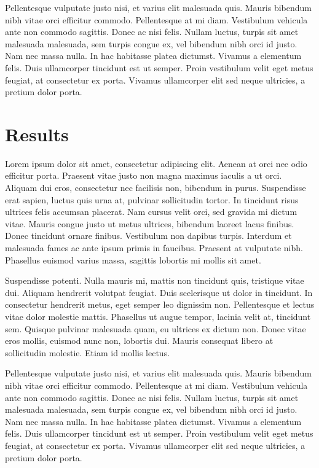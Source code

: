 \documentclass[12pt,]{article}
\begin{document}
Pellentesque vulputate justo nisi, et varius elit malesuada quis. Mauris
bibendum nibh vitae orci efficitur commodo. Pellentesque at mi diam.
Vestibulum vehicula ante non commodo sagittis. Donec ac nisi felis.
Nullam luctus, turpis sit amet malesuada malesuada, sem turpis congue
ex, vel bibendum nibh orci id justo. Nam nec massa nulla. In hac
habitasse platea dictumst. Vivamus a elementum felis. Duis ullamcorper
tincidunt est ut semper. Proin vestibulum velit eget metus feugiat, at
consectetur ex porta. Vivamus ullamcorper elit sed neque ultricies, a
pretium dolor porta.

\hypertarget{results}{%
\section{Results}\label{results}}

Lorem ipsum dolor sit amet, consectetur adipiscing elit. Aenean at orci
nec odio efficitur porta. Praesent vitae justo non magna maximus iaculis
a ut orci. Aliquam dui eros, consectetur nec facilisis non, bibendum in
purus. Suspendisse erat sapien, luctus quis urna at, pulvinar
sollicitudin tortor. In tincidunt risus ultrices felis accumsan
placerat. Nam cursus velit orci, sed gravida mi dictum vitae. Mauris
congue justo ut metus ultrices, bibendum laoreet lacus finibus. Donec
tincidunt ornare finibus. Vestibulum non dapibus turpis. Interdum et
malesuada fames ac ante ipsum primis in faucibus. Praesent at vulputate
nibh. Phasellus euismod varius massa, sagittis lobortis mi mollis sit
amet.

Suspendisse potenti. Nulla mauris mi, mattis non tincidunt quis,
tristique vitae dui. Aliquam hendrerit volutpat feugiat. Duis
scelerisque ut dolor in tincidunt. In consectetur hendrerit metus, eget
semper leo dignissim non. Pellentesque et lectus vitae dolor molestie
mattis. Phasellus ut augue tempor, lacinia velit at, tincidunt sem.
Quisque pulvinar malesuada quam, eu ultrices ex dictum non. Donec vitae
eros mollis, euismod nunc non, lobortis dui. Mauris consequat libero at
sollicitudin molestie. Etiam id mollis lectus.

Pellentesque vulputate justo nisi, et varius elit malesuada quis. Mauris
bibendum nibh vitae orci efficitur commodo. Pellentesque at mi diam.
Vestibulum vehicula ante non commodo sagittis. Donec ac nisi felis.
Nullam luctus, turpis sit amet malesuada malesuada, sem turpis congue
ex, vel bibendum nibh orci id justo. Nam nec massa nulla. In hac
habitasse platea dictumst. Vivamus a elementum felis. Duis ullamcorper
tincidunt est ut semper. Proin vestibulum velit eget metus feugiat, at
consectetur ex porta. Vivamus ullamcorper elit sed neque ultricies, a
pretium dolor porta.
\end{document}
